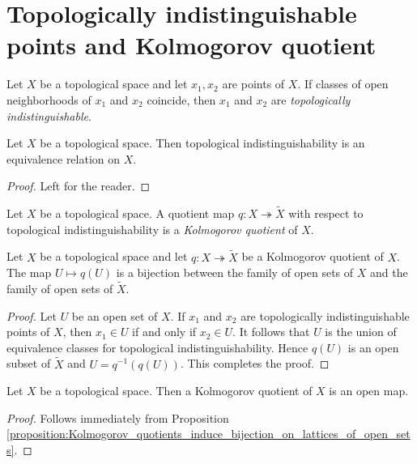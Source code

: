 \section{Topologically indistinguishable points and Kolmogorov quotient}

\begin{definition}
	Let $X$ be a topological space and let $x_1,x_2$ are points of $X$. If classes of open neighborhoods of $x_1$ and $x_2$ coincide, then $x_1$ and $x_2$ are \textit{topologically indistinguishable}.
\end{definition}

\begin{fact}\label{fact:topological_indistinguishability_is_equivalence}
	Let $X$ be a topological space. Then topological indistinguishability is an equivalence relation on $X$.
\end{fact}
\begin{proof}
	Left for the reader.
\end{proof}

\begin{definition}
	Let $X$ be a topological space. A quotient map $q:X\twoheadrightarrow \tilde{X}$ with respect to topological indistinguishability is a \textit{Kolmogorov quotient} of $X$.
\end{definition}


\begin{proposition}\label{proposition:Kolmogorov_quotients_induce_bijection_on_lattices_of_open_sets}
	Let $X$ be a topological space and let $q:X\twoheadrightarrow \tilde{X}$ be a Kolmogorov quotient of $X$. The map $U \mapsto q(U)$ is a bijection between the family of open sets of $X$ and the family of open sets of $\tilde{X}$.
\end{proposition}
\begin{proof}
	Let $U$ be an open set of $X$. If $x_1$ and $x_2$ are topologically indistinguishable points of $X$, then $x_1 \in U$ if and only if $x_2 \in U$. It follows that $U$ is the union of equivalence classes for topological indistinguishability. Hence $q(U)$ is an open subset of $\tilde{X}$ and $U = q^{-1}(q(U))$. This completes the proof.
\end{proof}

\begin{corollary}\label{corollary:Kolmogorov_quotient_is_open}
	Let $X$ be a topological space. Then a Kolmogorov quotient of $X$ is an open map.
\end{corollary}
\begin{proof}
	Follows immediately from Proposition \ref{proposition:Kolmogorov_quotients_induce_bijection_on_lattices_of_open_sets}.
\end{proof}

